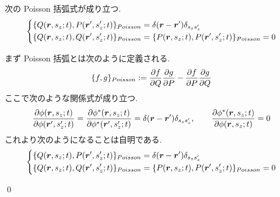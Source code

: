 \documentclass[uplatex,dvipdfmx,a4paper,11pt]{jlreq}
\makeatletter
\newcommand{\rr}{\bm{r}}
\numberwithin{equation}{section}
\theoremstyle{definition}
\renewenvironment{proof}[1][\proofname]{\par
  \normalfont
  \topsep6\p@\@plus6\p@ \trivlist
  \item[\hskip\labelsep{\bfseries #1}\@addpunct{\bfseries}]\ignorespaces\quad\par
}{
  \qed\endtrivlist\@endpefalse
}
\renewcommand\proofname{証明}
\makeatother
\begin{document}
\begin{theorem}[Q21-100]
  次の Poisson 括弧式が成り立つ.
  \begin{align}
    \begin{dcases}
      \{Q(\rr, s_z; t), P(\rr', s_z'; t)\}_{Poisson} = \delta(\rr - \rr')\delta_{s_zs_z'} \\
      \{Q(\rr, s_z; t), Q(\rr', s_z'; t)\}_{Poisson} = \{P(\rr, s_z; t), P(\rr', s_z'; t)\}_{Poisson} = 0
    \end{dcases}
  \end{align}
\end{theorem}
\begin{proof}
  まず Poisson 括弧とは次のように定義される.
  \begin{align}
    \{f, g\}_{Poisson} := \diffp{f}{Q}\diffp{g}{P} - \diffp{f}{P}\diffp{g}{Q}
  \end{align}
  ここで次のような関係式が成り立つ.
  \begin{align}
    \diffp{\phi(\rr, s_z; t)}{{\phi(\rr', s_z'; t)}} = \diffp{\phi^*(\rr, s_z; t)}{{\phi^*(\rr', s_z'; t)}} = \delta(\rr - \rr')\delta_{s_zs_z'}, \qquad \diffp{\phi^*(\rr, s_z; t)}{{\phi(\rr, s_z; t)}} = 0
  \end{align}
  これより次のようになることは自明である.
  \begin{align}
    \begin{dcases}
      \{Q(\rr, s_z; t), P(\rr', s_z'; t)\}_{Poisson} = \delta(\rr - \rr')\delta_{s_zs_z'} \\
      \{Q(\rr, s_z; t), Q(\rr', s_z'; t)\}_{Poisson} = \{P(\rr, s_z; t), P(\rr', s_z'; t)\}_{Poisson} = 0
    \end{dcases}
  \end{align}
\end{proof}
\end{document}
